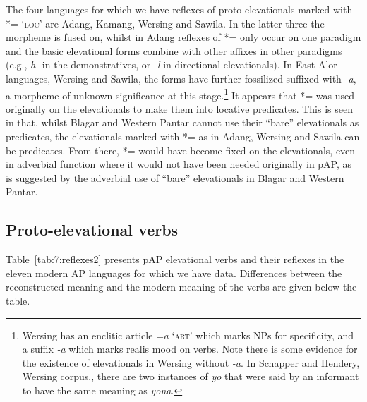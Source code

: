 The four languages for which we have reflexes of proto-elevationals marked with *={\ng} `\textsc{loc}' are Adang, Kamang, Wersing and Sawila. In the latter three the morpheme is fused on, whilst in Adang reflexes of *={\ng} only occur on one paradigm and the basic elevational forms combine with other affixes in other paradigms (e.g., \textit{h}\textit{{\textepsilon}}\textit{{}-} in the demonstratives, or \textit{{}-l}\textit{{\textepsilon}} in directional elevationals). In East Alor languages, Wersing and Sawila, the forms have further fossilized suffixed with \textit{{}-a}, a morpheme of unknown significance at this stage.\footnote{Wersing has an enclitic article \textit{=a} `\textsc{art}' which marks NPs for specificity, and a suffix \textit{{}-a} which marks realis mood on verbs. Note there is some evidence for the existence of elevationals in Wersing without \textit{{}-a}. In Schapper and Hendery, Wersing corpus., there are two instances of \textit{yo{\ng}} that were said by an informant to have the same meaning as \textit{yona}.} It appears that *={\ng} was used originally on the elevationals to make them into locative predicates. This is seen in that, whilst Blagar and Western Pantar cannot use their ``bare'' elevationals as predicates, the elevationals marked with *={\ng} as in Adang,  Wersing and Sawila can be predicates. From there, *={\ng} would have become fixed on the elevationals, even in adverbial function where it would not have been needed originally in pAP, as is suggested by the adverbial use of ``bare'' elevationals in Blagar and Western Pantar.

\subsection{Proto-elevational verbs}\label{sec:7:4.2}
Table~\ref{tab:7:reflexes2} presents pAP elevational verbs and their reflexes in the eleven modern AP languages for which we have data. Differences between the reconstructed meaning and the modern meaning of the verbs are given below the table. 

